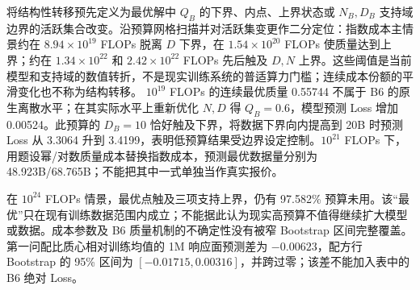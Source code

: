 将结构性转移预先定义为最优解中 $Q_B$ 的下界、内点、上界状态或 $N_B,D_B$ 支持域边界的活跃集合改变。沿预算网格扫描并对活跃集变更作二分定位：指数成本主情景约在 $8.94\times10^{19}$ FLOPs 脱离 $D$ 下界，在 $1.54\times10^{20}$ FLOPs 使质量达到上界；约在 $1.34\times10^{22}$ 和 $2.42\times10^{22}$ FLOPs 先后触及 $D,N$ 上界。这些阈值是当前模型和支持域的数值转折，不是现实训练系统的普适算力门槛；连续成本份额的平滑变化也不称为结构转移。
$10^{19}$ FLOPs 的连续最优质量 0.55744 不属于 B6 的原生离散水平；在其实际水平上重新优化 $N,D$ 得 $Q_B=0.6$，模型预测 Loss 增加 0.00524。此预算的 $D_B=10$ 恰好触及下界，将数据下界向内提高到 20B 时预测 Loss 从 3.3064 升到 3.4199，表明低预算结果受边界设定控制。$10^{21}$ FLOPs 下，用题设幂/对数质量成本替换指数成本，预测最优数据量分别为 48.923B/68.765B；不能把其中一式单独当作真实报价。

在 $10^{24}$ FLOPs 情景，最优点触及三项支持上界，仍有 97.582\% 预算未用。该“最优”只在现有训练数据范围内成立；不能据此认为现实高预算不值得继续扩大模型或数据。成本参数及 B6 质量机制的不确定性没有被窄 Bootstrap 区间完整覆盖。第一问配比质心相对训练均值的 1M 响应面预测差为 $-0.00623$，配方行 Bootstrap 的 95\% 区间为 $[-0.01715,0.00316]$，并跨过零；该差不能加入表中的 B6 绝对 Loss。
